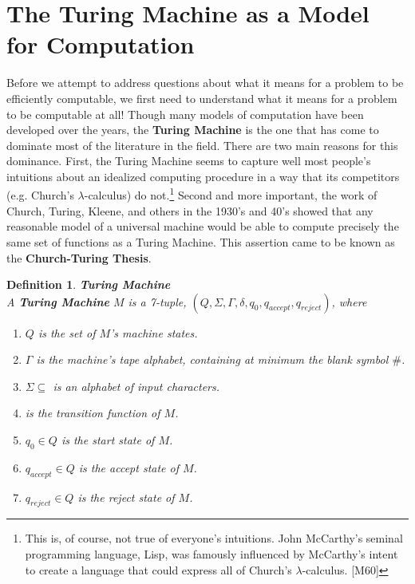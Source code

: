 \documentclass{article}
\newcommand{\blank}{\#}
\newtheorem{definition}{Definition}[section]
\renewcommand{\cite}[1]{[#1]}
\renewcommand{\cite}[1]{[#1]}
\begin{document}
\section{The Turing Machine as a Model for Computation}

Before we attempt to address questions about what it means for a
problem to be efficiently computable, we first need to understand what
it means for a problem to be computable at all!  Though many models of
computation have been developed over the years, the \textbf{Turing
  Machine} is the one that has come to dominate most of the literature
in the field.  There are two main reasons for this dominance. First,
the Turing Machine seems to capture well most people's intuitions
about an idealized computing procedure in a way that its competitors
(e.g. Church's $\lambda$-calculus) do not.\footnote[1]{This is, of
  course, not true of everyone's intuitions.  John McCarthy's seminal
  programming language, Lisp, was famously influenced by McCarthy's
  intent to create a language that could express all of Church's
  $\lambda$-calculus. \cite{M60}} Second and more important, the work
of Church, Turing, Kleene, and others in the 1930's and 40's showed
that any reasonable model of a universal machine would be able to
compute precisely the same set of functions as a Turing Machine.  This
assertion came to be known as the
\textbf{Church-Turing Thesis}.\\

\begin{definition}{\textbf{Turing Machine}}\\

  A \textbf{Turing Machine} $M$ is a 7-tuple, $(Q, \Sigma,
  \Gamma, \delta, q_0, q_{accept}, q_{reject})$, where
  \begin{enumerate}
  \item $Q$ is the set of $M$'s machine states.
  \item $\Gamma$ is the machine's tape alphabet, containing at
    minimum the blank symbol $\blank$.
  \item $\Sigma \subseteq$ is an alphabet of input characters. 
  \item {} is the transition function of $M$.
  \item $q_0 \in Q$ is the start state of $M$.
  \item $q_{accept} \in Q$ is the accept state of $M$.
  \item $q_{reject} \in Q$ is the reject state of $M$.\\
  \end{enumerate}
\end{definition}
\end{document}
